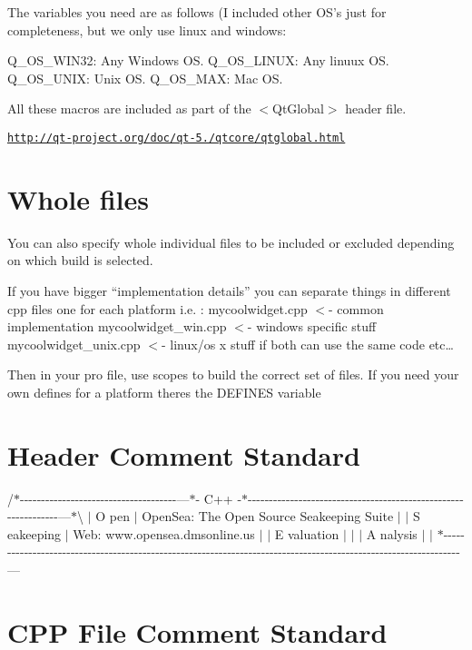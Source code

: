 The variables you need are as follows (I included other O\-S's just for completeness, but we only use linux and windows\-:


\begin{DoxyEnumerate}
\item Q\-\_\-\-O\-S\-\_\-\-W\-I\-N32\-: Any Windows O\-S. Q\-\_\-\-O\-S\-\_\-\-L\-I\-N\-U\-X\-: Any linuux O\-S. Q\-\_\-\-O\-S\-\_\-\-U\-N\-I\-X\-: Unix O\-S. Q\-\_\-\-O\-S\-\_\-\-M\-A\-X\-: Mac O\-S.
\end{DoxyEnumerate}

All these macros are included as part of the $<$\-Qt\-Global$>$ header file.

\href{http://qt-project.org/doc/qt-5.0/qtcore/qtglobal.html}{\tt http\-://qt-\/project.\-org/doc/qt-\/5./qtcore/qtglobal.\-html}

\section*{Whole files}

You can also specify whole individual files to be included or excluded depending on which build is selected.

If you have bigger “implementation details” you can separate things in different cpp files one for each platform i.\-e. \-: mycoolwidget.\-cpp $<$-\/ common implementation mycoolwidget\-\_\-win.\-cpp $<$-\/ windows specific stuff mycoolwidget\-\_\-unix.\-cpp $<$-\/ linux/os x stuff if both can use the same code etc…

Then in your pro file, use scopes to build the correct set of files. If you need your own defines for a platform theres the D\-E\-F\-I\-N\-E\-S variable \hypertarget{HeaderComment}{}\section{Header Comment Standard}\label{HeaderComment}
/$\ast$-\/-\/-\/-\/-\/-\/-\/-\/-\/-\/-\/-\/-\/-\/-\/-\/-\/-\/-\/-\/-\/-\/-\/-\/-\/-\/-\/-\/-\/-\/-\/-\/-\/-\/-\/-\/-\/---$\ast$-\/ C++ -\/$\ast$-\/-\/-\/-\/-\/-\/-\/-\/-\/-\/-\/-\/-\/-\/-\/-\/-\/-\/-\/-\/-\/-\/-\/-\/-\/-\/-\/-\/-\/-\/-\/-\/-\/-\/-\/-\/-\/-\/-\/-\/-\/-\/-\/-\/-\/-\/-\/-\/-\/-\/-\/-\/-\/-\/-\/-\/-\/-\/-\/-\/-\/-\/-\/---$\ast$\textbackslash{} $|$ O pen $|$ Open\-Sea\-: The Open Source Seakeeping Suite $|$ $|$ S eakeeping $|$ Web\-: www.\-opensea.\-dmsonline.\-us $|$ $|$ E valuation $|$ $|$ $|$ A nalysis $|$ $|$ $\ast$-\/-\/-\/-\/-\/-\/-\/-\/-\/-\/-\/-\/-\/-\/-\/-\/-\/-\/-\/-\/-\/-\/-\/-\/-\/-\/-\/-\/-\/-\/-\/-\/-\/-\/-\/-\/-\/-\/-\/-\/-\/-\/-\/-\/-\/-\/-\/-\/-\/-\/-\/-\/-\/-\/-\/-\/-\/-\/-\/-\/-\/-\/-\/-\/-\/-\/-\/-\/-\/-\/-\/-\/-\/-\/-\/-\/-\/-\/-\/-\/-\/-\/-\/-\/-\/-\/-\/-\/-\/-\/-\/-\/-\/-\/-\/-\/-\/-\/-\/-\/-\/-\/-\/-\/-\/-\/-\/-\/-\/-\/-\/-\/--- \hypertarget{CPP_Comments}{}\section{C\-P\-P File Comment Standard}\label{CPP_Comments}
